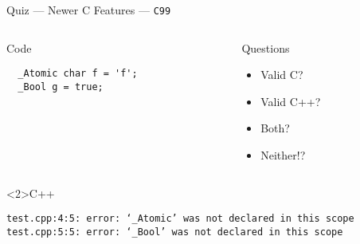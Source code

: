 \documentclass[presentation,aspectratio=169]{beamer}
\begin{document}
\begin{frame}[fragile,label={sec:org23c4234}]{Quiz — Newer C Features — \texttt{C99}}
\begin{columns}
\begin{column}{0.48\columnwidth}
\begin{block}{Code}
\begin{verbatim}
  _Atomic char f = 'f';
  _Bool g = true;
\end{verbatim}
\end{block}
\end{column}

\begin{column}{0.48\columnwidth}
\begin{block}{Questions}
\begin{itemize}
\item Valid C?
\item Valid C++?
\item Both?
\item Neither!?
\end{itemize}
\end{block}
\end{column}
\end{columns}

\begin{block}<2>{C++}
\begin{verbatim}
test.cpp:4:5: error: ‘_Atomic’ was not declared in this scope
test.cpp:5:5: error: ‘_Bool’ was not declared in this scope
\end{verbatim}
\end{block}
\end{frame}

\end{document}
